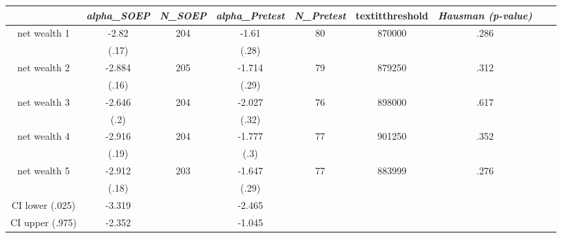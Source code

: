 \begin{tabular}{ccccccccc}
\hline \textit{}&   \textit{alpha\_SOEP}&   \textit{N\_SOEP}&       \textit{alpha\_Pretest}&        \textit{N\_Pretest}&    textit{threshold}&      \textit{Hausman (p-value)}\\ \hline
net wealth 1&-2.82&204&-1.61&80&870000&.286\\
&(.17)&&(.28)&&&\\
net wealth 2&-2.884&205&-1.714&79&879250&.312\\
&(.16)&&(.29)&&&\\
net wealth 3&-2.646&204&-2.027&76&898000&.617\\
&(.2)&&(.32)&&&\\
net wealth 4&-2.916&204&-1.777&77&901250&.352\\
&(.19)&&(.3)&&&\\
net wealth 5&-2.912&203&-1.647&77&883999&.276\\
&(.18)&&(.29)&&&\\
CI lower (.025)&-3.319&&-2.465&&&\\
CI upper (.975)&-2.352&&-1.045&&&\\
\hline \end{tabular}
